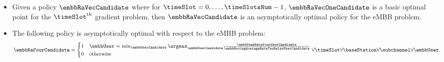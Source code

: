 \begin{frame}
  \begin{itemize}
    \item Given a policy $\embbRaVecCandidate$ where for $\timeSlot = 0, \dots, \timeSlotsNum - 1$, $\embbRaVecOneCandidate$ is a basic optimal point for the $\timeSlot^{th}$ gradient problem, then $\embbRaVecCandidate$ is an asymptotically optimal policy for the eMBB problem\proofFootnote.
  \end{itemize}
\end{frame}

\begin{frame}
  \begin{itemize}
    \item The following policy is asymptotically optimal with respect to the eMBB problem\proofFootnote:
      \begin{equation}
        \embbRaFourCandidate =
          \begin{cases}
            1 &\embbUser = \min_{\embbUserCandidate}{\argmax_{\embbUserCandidate}{\frac{\embbPeakRateFourUserCandidate}{\embbMovingAverageRateTwoRelaxUserCandidate}}}\\
            0 &\text{otherwise}
          \end{cases} \forall\timeSlot \forall\baseStation \forall\subchannel \forall\embbUser.
      \end{equation}
  \end{itemize}
\end{frame}

